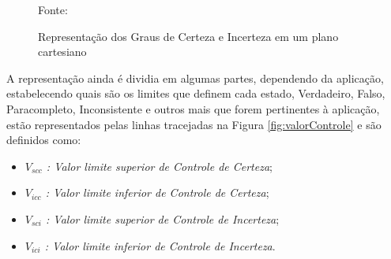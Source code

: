 \begin{figure}[!h]
\centering
\caption{Representação dos Graus de Certeza e Incerteza em um plano cartesiano}
\label{fig:retasgcgct}

{\small Fonte: \cite{JoaoInacio}}
\end{figure}











A representação ainda é dividia em algumas partes, dependendo da aplicação, estabelecendo quais são os limites que definem cada estado, Verdadeiro, Falso, Paracompleto, Inconsistente e outros mais que forem pertinentes à aplicação, estão representados pelas linhas tracejadas na Figura \ref{fig:valorControle} e são definidos como:

\begin{itemize}
\item \emph{$V_{scc}$ : Valor limite superior de Controle de Certeza};
\item \emph{$V_{icc}$ : Valor limite inferior de Controle de Certeza};
\item \emph{$V_{sci}$ : Valor limite superior de Controle de Incerteza};
\item \emph{$V_{ici}$ : Valor limite inferior de Controle de Incerteza}.
\end{itemize}



